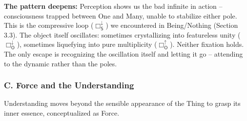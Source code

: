 \documentclass[12pt]{book}
\begin{document}
\textbf{The pattern deepens:} Perception shows us the bad infinite in action -- consciousness trapped between One and Many, unable to stabilize either pole. This is the compressive loop ($\Box_{\mathsf{S}}^{\downarrow}$) we encountered in Being/Nothing (Section 3.3). The object itself oscillates: sometimes crystallizing into featureless unity ($\Box_{\mathsf{O}}^{\downarrow}$), sometimes liquefying into pure multiplicity ($\Box_{\mathsf{O}}^{\uparrow}$). Neither fixation holds. The only escape is recognizing the oscillation itself and letting it go -- attending to the dynamic rather than the poles.

\subsubsection{C. Force and the Understanding}

Understanding moves beyond the sensible appearance of the Thing to grasp its inner essence, conceptualized as Force.
\end{document}

